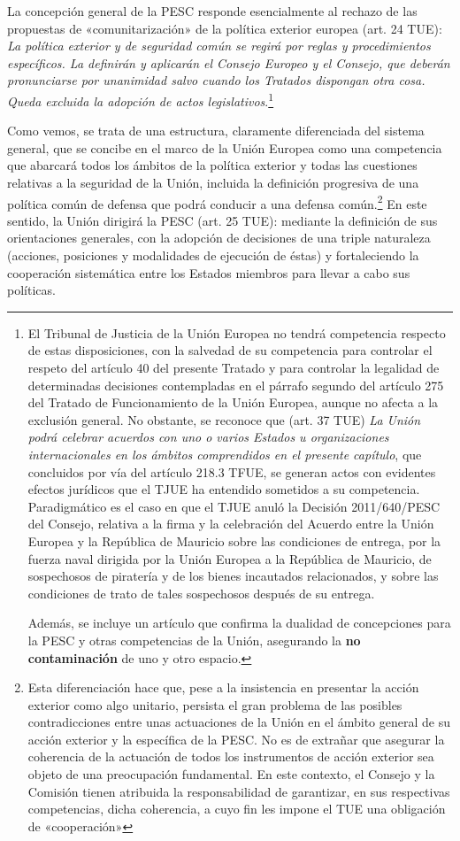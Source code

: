 \documentclass[10pt,a4paper]{article}
\begin{document}
La concepción general de la PESC responde esencialmente al rechazo de las propuestas de «comunitarización» de la política exterior europea (art. 24 TUE): \textit{La política exterior y de seguridad común se regirá por reglas y procedimientos específicos. La definirán y aplicarán el Consejo Europeo y el Consejo, que deberán pronunciarse por unanimidad salvo cuando los Tratados dispongan otra cosa. Queda excluida la adopción de actos legislativos}.\footnote{%
    El Tribunal de Justicia de la Unión Europea no tendrá competencia respecto de estas disposiciones, con la salvedad de su competencia para controlar el respeto del artículo 40 del presente Tratado y para controlar la legalidad de determinadas decisiones contempladas en el párrafo segundo del artículo 275 del Tratado de Funcionamiento de la Unión Europea, aunque no afecta a la exclusión general. No obstante, se reconoce que (art. 37 TUE) \textit{La Unión podrá celebrar acuerdos con uno o varios Estados u organizaciones internacionales en los ámbitos comprendidos en el presente capítulo}, que concluidos por vía del artículo 218.3 TFUE, se generan actos con evidentes efectos jurídicos que el TJUE ha entendido sometidos a su competencia. Paradigmático es el caso en que el TJUE anuló la Decisión 2011/640/PESC del Consejo, relativa a la firma y la celebración del Acuerdo entre la Unión Europea y la República de Mauricio sobre las condiciones de entrega, por la fuerza naval dirigida por la Unión Europea a la República de Mauricio, de sospechosos de piratería y de los bienes incautados relacionados, y sobre las condiciones de trato de tales sospechosos después de su entrega.

Además, se incluye un artículo que confirma la dualidad de concepciones para la PESC y otras competencias de la Unión, asegurando la \textbf{no contaminación} de uno y otro espacio.
} 

Como vemos, se trata de una estructura, claramente diferenciada del sistema general, que se concibe en el marco de la Unión Europea como una competencia que abarcará todos los ámbitos de la política exterior y todas las cuestiones relativas a la seguridad de la Unión, incluida la definición progresiva de una política común de defensa que podrá conducir a una defensa común.\footnote{%
    Esta diferenciación hace que, pese a la insistencia en presentar la acción exterior como algo unitario, persista el gran problema de las posibles contradicciones entre unas actuaciones de la Unión en el ámbito general de su acción exterior y la específica de la PESC. No es de extrañar que asegurar la coherencia de la actuación de todos los instrumentos de acción exterior sea objeto de una preocupación fundamental. En este contexto, el Consejo y la Comisión tienen atribuida la responsabilidad de garantizar, en sus respectivas competencias, dicha coherencia, a cuyo fin les impone el TUE una obligación de «cooperación»
} En este sentido, la Unión dirigirá la PESC (art. 25 TUE): mediante la definición de sus orientaciones generales, con la adopción de decisiones de una triple naturaleza (acciones, posiciones y modalidades de ejecución de éstas) y fortaleciendo la cooperación sistemática entre los Estados miembros para llevar a cabo sus políticas.
\end{document}
